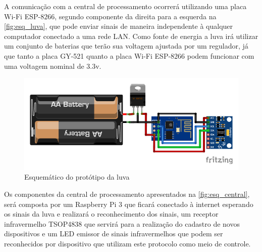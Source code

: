 A comunicação com a central de processamento ocorrerá utilizando uma placa Wi-Fi ESP-$8266$, segundo componente da direita para a esquerda na \autoref{fig:esq_luva}, que pode enviar sinais de maneira independente à qualquer computador conectado a uma rede LAN. Como fonte de energia a luva irá utilizar um conjunto de baterias que terão sua voltagem ajustada por um regulador, já que tanto a placa GY-521 quanto a placa Wi-Fi ESP-$8266$ podem funcionar com uma voltagem nominal de 3.3v.




\begin{figure}[ht]
    \centering
    \includegraphics{resources/esquematico_tcc_bb.pdf}
    \caption{Esquemático do protótipo da luva}
    \label{fig:esq_luva}
\end{figure}

Os componentes da central de processamento apresentados na \autoref{fig:esq_central}, será composta por um Raspberry Pi 3 \cite{raspberry:pi3} que ficará conectado à internet esperando os sinais da luva e realizará o reconhecimento dos sinais, um receptor infravermelho TSOP4838 que servirá para a realização do cadastro de novos dispositivos e um LED emissor de sinais infravermelhos que podem ser reconhecidos por dispositivo que utilizam este protocolo como meio de controle.

